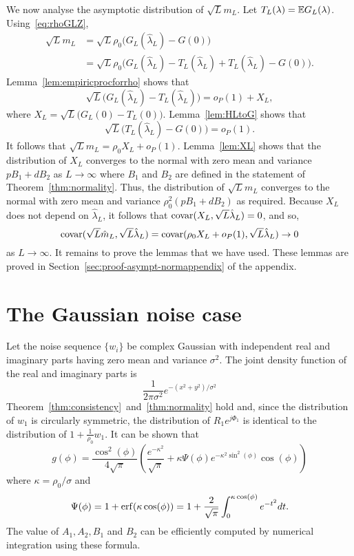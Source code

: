 \documentclass[journal]{IEEEtran}
\begin{document}
We now analyse the asymptotic distribution of $\sqrt{L} m_L$.  Let $T_L(\lambda) = {\mathbb E} G_L(\lambda)$.  Using~\eqref{eq:rhoGLZ},
\begin{align*}
\sqrt{L} m_L &= \sqrt{L} \rho_0 \big( G_L(\hat{\lambda}_L) - G(0) \big) \\
&= \sqrt{L} \rho_0 \big( G_L(\hat{\lambda}_L) - T_L(\hat{\lambda}_L) + T_L(\hat{\lambda}_L) - G(0) \big).
\end{align*}
Lemma~\ref{lem:empiricprocforrho} shows that 
\[
\sqrt{L}\big( G_L(\hat{\lambda}_L) - T_L(\hat{\lambda}_L)  \big) = o_P(1) + X_L,
\]
where $X_L = \sqrt{L}\big( G_L(0) - T_L(0)  \big)$.  Lemma~\ref{lem:HLtoG} shows that
\[
\sqrt{L}\big( T_L(\hat{\lambda}_L) - G(0) \big) = o_P(1).
\]
It follows that $\sqrt{L} m_L =  \rho_0 X_L + o_P(1)$.  Lemma~\ref{lem:XL} shows that the distribution of $X_L$ converges to the normal with zero mean and variance $p B_1 + d B_2$ as $L\rightarrow\infty$ where $B_1$ and $B_2$ are defined in the statement of Theorem~\ref{thm:normality}.  Thus, the distribution of $\sqrt{L} m_L$ converges to the normal with zero mean and variance $\rho_0^2(p B_1 + d B_2)$ as required.  Because $X_L$ does not depend on $\hat{\lambda}_L$, it follows that $\operatorname{covar}(X_L, \sqrt{L}\hat{\lambda}_L) = 0$, and so,
\[
\operatorname{covar}(\sqrt{L}\hat{m}_L, \sqrt{L}\hat{\lambda}_L) = \operatorname{covar}(\rho_0 X_L + o_P(1), \sqrt{L}\hat{\lambda}_L) \rightarrow 0
\]
as $L \rightarrow \infty$.  It remains to prove the lemmas that we have used.  These lemmas are proved in Section~\ref{sec:proof-asympt-normappendix} of the appendix.



\section{The Gaussian noise case}\label{sec:gaussian-noise-case}

Let the noise sequence $\{w_i\}$ be complex Gaussian with independent real and imaginary parts having zero mean and variance $\sigma^2$.  The joint density function of the real and imaginary parts is
\[
\frac{1}{2\pi\sigma^2}e^{-(x^2 + y^2)/\sigma^2}
\]
Theorem~\ref{thm:consistency}~and~\ref{thm:normality} hold and, since the distribution of $w_1$ is circularly symmetric, the distribution of $R_1e^{j\Phi_1}$ is identical to the distribution of $1 + \frac{1}{\rho_0} w_1$.
It can be shown that
\[
g(\phi) = \frac{\cos^2(\phi)}{4\sqrt{\pi}}\left( \frac{e^{-\kappa^2} }{\sqrt{\pi}} + \kappa \Psi(\phi)  e^{-\kappa^2\sin^2(\phi)}\cos(\phi) \right)
\]
where $\kappa = \rho_0/\sigma$ and
\[
\Psi(\phi) = 1 + \operatorname{erf}(\kappa \cos(\phi)) = 1 + \frac{2}{\sqrt{\pi}}\int_0^{\kappa \cos(\phi)} e^{-t^2} dt .
\]
The value of $A_1, A_2, B_1$ and $B_2$ can be efficiently computed by numerical integration using these formula.
\end{document}
